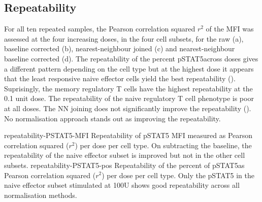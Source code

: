 \clearpage



\subsection{Repeatability}


For all ten repeated samples, the Pearson correlation squared $r^2$ of the MFI was assessed at the four increasing doses, in the four cell subsets,
for the raw (a),
baseline corrected (b),
nearest-neighbour joined (c)
and nearest-neighbour baseline corrected (d).
The repeatability of the percent pSTAT5\positive across doses gives a different pattern depending on the cell type
but at the highest dose it appears that the least responsive naive effector cells yield the best
repeatability ().
Suprisingly, the memory regulatory T cells have the highest repeatability at the 0.1 unit dose.
The repeatability of the naive regulatory T cell phenotype is poor at all doses.  
The NN joining does not significantly improve the repeatability ().
No normalisation approach stands out as improving the repeatability.

{repeatability-PSTAT5-MFI}
{
  Repeatability of pSTAT5 MFI measured as Pearson correlation squared ($r^2$) per dose per cell type.
}
{
  On subtracting the baseline, the repeatability of the naive effector subset is improved but not in the other cell subsets.
} 
{repeatability-PSTAT5-pos}
{
  Repeatability of the percent of pSTAT5\positive as Pearson correlation squared ($r^2$) per dose per cell type.
}
{
  Only the pSTAT5 in the naive effector subset stimulated at 100U shows good repeatability across all normalisation methods.
}

